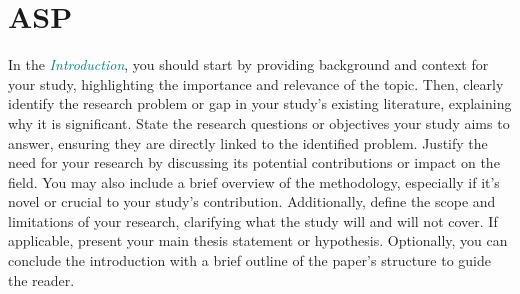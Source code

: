 \section{ASP}
\label{sec:asp}


In the \textcolor{teal}{\textit{Introduction}}, you should start by providing background and context for your study, highlighting the importance and relevance of the topic. 
Then, clearly identify the research problem or gap in your study's existing literature, explaining why it is significant. 
State the research questions or objectives your study aims to answer, ensuring they are directly linked to the identified problem. 
Justify the need for your research by discussing its potential contributions or impact on the field.
You may also include a brief overview of the methodology, especially if it's novel or crucial to your study's contribution. 
Additionally, define the scope and limitations of your research, clarifying what the study will and will not cover.
If applicable, present your main thesis statement or hypothesis. 
Optionally, you can conclude the introduction with a brief outline of the paper's structure to guide the reader.